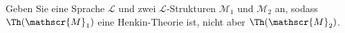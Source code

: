 
\begin{exercise}[139]

Geben Sie eine Sprache $\mathscr{L}$ und zwei $\mathscr{L}$-Strukturen $\mathscr{M}_1$
und $\mathscr{M}_2$ an, sodass $\Th(\mathscr{M}_1)$ eine Henkin-Theorie ist,
nicht aber $\Th(\mathscr{M}_2)$.

\end{exercise}


\begin{solution}

\phantom{}

\end{solution}

